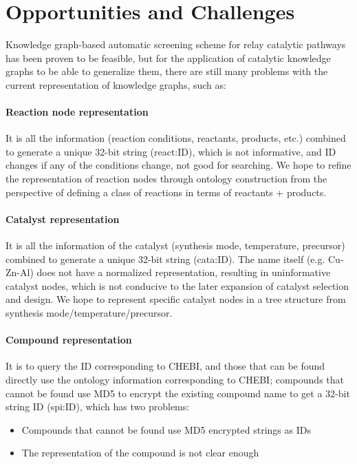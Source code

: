 \documentclass[%
 aip,
 jmp,%
 amsmath,amssymb,
 reprint,%
]{revtex4-2}
\begin{document}
\section{Opportunities and Challenges}

Knowledge graph-based automatic screening scheme for relay catalytic pathways has been proven to be feasible, but for the application of catalytic knowledge graphs to be able to generalize them, there are still many problems with the current representation of knowledge graphs, such as:

\paragraph{Reaction node representation}It is all the information (reaction conditions, reactants, products, etc.) combined to generate a unique 32-bit string (react:ID), which is not informative, and ID changes if any of the conditions change, not good for searching. We hope to refine the representation of reaction nodes through ontology construction from the perspective of defining a class of reactions in terms of reactants + products.

\paragraph{Catalyst representation}It is all the information of the catalyst (synthesis mode, temperature, precursor) combined to generate a unique 32-bit string (cata:ID). The name itself (e.g. Cu-Zn-Al) does not have a normalized representation, resulting in uninformative catalyst nodes, which is not conducive to the later expansion of catalyst selection and design. We hope to represent specific catalyst nodes in a tree structure from synthesis mode/temperature/precursor.
\paragraph{Compound representation}It is to query the ID corresponding to CHEBI, and those that can be found directly use the ontology information corresponding to CHEBI; compounds that cannot be found use MD5 to encrypt the existing compound name to get a 32-bit string ID (spi:ID), which has two problems:

\begin{itemize}
    \item Compounds that cannot be found use MD5 encrypted strings as IDs
    \item The representation of the compound is not clear enough
\end{itemize}
	
\end{document}
